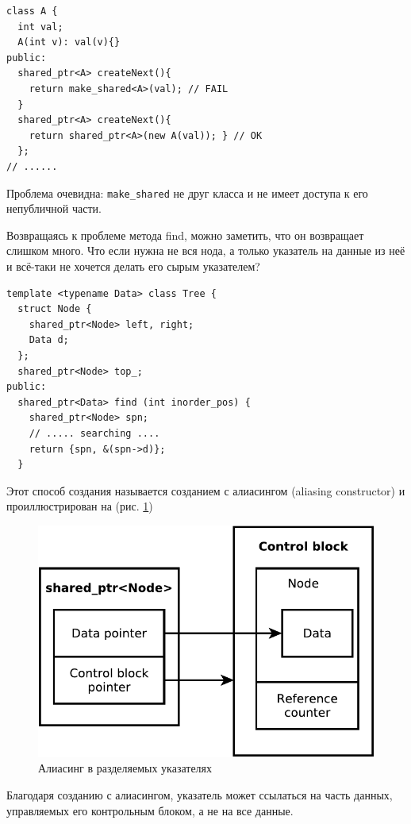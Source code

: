 \documentclass[a4paper,12pt,oneside]{article}
\begin{document}
\begin{lstlisting}
class A {
  int val;
  A(int v): val(v){}
public:
  shared_ptr<A> createNext(){ 
    return make_shared<A>(val); // FAIL 
  }
  shared_ptr<A> createNext(){ 
    return shared_ptr<A>(new A(val)); } // OK
  };
// ......
\end{lstlisting}

Проблема очевидна: \lstinline!make_shared! не друг класса и не имеет доступа к его непубличной части.

Возвращаясь к проблеме метода find, можно заметить, что он возвращает слишком много. Что если нужна не вся нода, а только указатель на данные из неё и всё-таки не хочется делать его сырым указателем?

\begin{lstlisting}
template <typename Data> class Tree {
  struct Node {
    shared_ptr<Node> left, right;
    Data d;
  };
  shared_ptr<Node> top_;
public: 
  shared_ptr<Data> find (int inorder_pos) {
    shared_ptr<Node> spn;
    // ..... searching ....
    return {spn, &(spn->d)};
  }
\end{lstlisting}

Этот способ создания называется созданием с алиасингом (aliasing constructor) и проиллюстрирован на (рис. \ref{fig:smartptrs-aliased})

\begin{figure}[ht]
\centering
\includegraphics[width=1.0\textwidth]{illustrations/smartptrs-aliased-crop.pdf}
\caption{Алиасинг в разделяемых указателях}
\label{fig:smartptrs-aliased}
\end{figure}

Благодаря созданию с алиасингом, указатель может ссылаться на часть данных, управляемых его контрольным блоком, а не на все данные.
\end{document}

